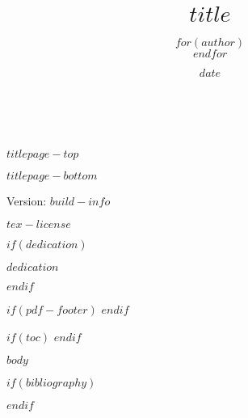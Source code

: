 \documentclass[
  notoc %
]{tufte-book}
\title{$title$}
\author{$for(author)$\noindent{$author$}\\[3mm] $endfor$}
\date{$date$}
\let\cleardoublepage\clearpage
\begin{document}
\makeatletter
\thispagestyle{empty}
\vfill
{\Huge\bf
\noindent
\@title
}\\[1in]
{\Large
\noindent
\@author
}
\makeatother

\makeatletter
\newpage
\thispagestyle{empty}
\vfill
{\noindent
$titlepage-top$
}
\vfill
{\small
$titlepage-bottom$

Version: $build-info$

$tex-license$
}
\makeatother

$if(dedication)$
\newpage
\thispagestyle{empty}
\begin{center}
    \vspace*{\fill}
    $dedication$
    \vspace*{\fill}
\end{center}
\cleardoublepage
$endif$

\frontmatter
\mainmatter
$if(pdf-footer)$
$endif$

$if(toc)$
\setcounter{tocdepth}{$tocdepth$}
\tableofcontents
$endif$

\justifying

\setlength{\parindent}{0pt}

$body$

\backmatter

$if(bibliography)$

$endif$
\end{document}
